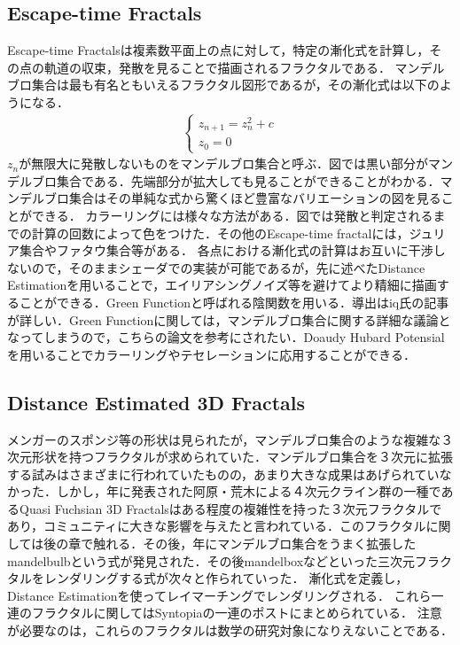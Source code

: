 \subsection{Escape-time Fractals}
Escape-time Fractalsは複素数平面上の点に対して，特定の漸化式を計算し，その点の軌道の収束，発散を見ることで描画されるフラクタルである．
マンデルブロ集合は最も有名ともいえるフラクタル図形であるが，その漸化式は以下のようになる．
\begin{eqnarray*}
 \begin{cases}
  z_{n+1} = z^2_{n} + c \\ z_0 = 0
 \end{cases}
\end{eqnarray*}
$z_n$が無限大に発散しないものをマンデルブロ集合と呼ぶ．図では黒い部分がマンデルブロ集合である．先端部分が拡大しても見ることができることがわかる．マンデルブロ集合はその単純な式から驚くほど豊富なバリエーションの図を見ることができる．
カラーリングには様々な方法がある．図では発散と判定されるまでの計算の回数によって色をつけた．その他のEscape-time fractalには，ジュリア集合やファタウ集合等がある．
各点における漸化式の計算はお互いに干渉しないので，そのままシェーダでの実装が可能であるが，先に述べたDistance Estimationを用いることで，エイリアシングノイズ等を避けてより精細に描画することができる．Green Functionと呼ばれる陰関数を用いる．導出はiq氏の記事が詳しい．Green Functionに関しては，マンデルブロ集合に関する詳細な議論となってしまうので，こちらの論文を参考にされたい．Doaudy Hubard Potensialを用いることでカラーリングやテセレーションに応用することができる．

\subsection{Distance Estimated 3D Fractals}
メンガーのスポンジ等の形状は見られたが，マンデルブロ集合のような複雑な３次元形状を持つフラクタルが求められていた．マンデルブロ集合を３次元に拡張する試みはさまざまに行われていたものの，あまり大きな成果はあげられていなかった．しかし，年に発表された阿原・荒木による４次元クライン群の一種であるQuasi Fuchsian 3D Fractalsはある程度の複雑性を持った３次元フラクタルであり，コミュニティに大きな影響を与えたと言われている．このフラクタルに関しては後の章で触れる．その後，年にマンデルブロ集合をうまく拡張したmandelbulbという式が発見された．その後mandelboxなどといった三次元フラクタルをレンダリングする式が次々と作られていった．
漸化式を定義し，Distance Estimationを使ってレイマーチングでレンダリングされる．
これら一連のフラクタルに関してはSyntopiaの一連のポストにまとめられている．
注意が必要なのは，これらのフラクタルは数学の研究対象になりえないことである．
